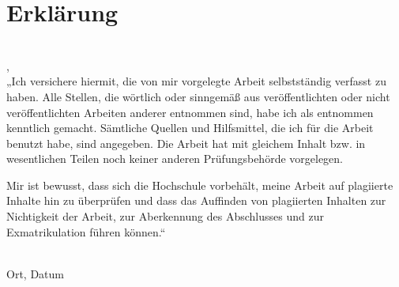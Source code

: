 \section*{Erklärung}

\Author \\
\addressStreet, \addressZipCode \\

„Ich versichere hiermit, die von mir vorgelegte Arbeit selbstständig verfasst zu haben. Alle Stellen, die wörtlich oder sinngemäß aus veröffentlichten oder nicht veröffentlichten Arbeiten anderer entnommen sind, habe ich als entnommen kenntlich gemacht. Sämtliche Quellen und Hilfsmittel, die ich für die Arbeit benutzt habe, sind angegeben. Die Arbeit hat mit gleichem Inhalt bzw. in wesentlichen Teilen noch keiner anderen Prüfungsbehörde vorgelegen.

Mir ist bewusst, dass sich die Hochschule vorbehält, meine Arbeit auf plagiierte Inhalte hin zu überprüfen und dass das Auffinden von plagiierten Inhalten zur Nichtigkeit der Arbeit, zur Aberkennung des Abschlusses und zur Exmatrikulation führen können.“
\vspace{3cm}


\noindent\parbox[t]{5cm}{\underline{\hspace{5cm}}\\\noindent Ort, Datum}%
\hfill%
\noindent\parbox[t]{5cm}{\noindent\underline{\hspace{5cm}}\\\noindent \Author}%
